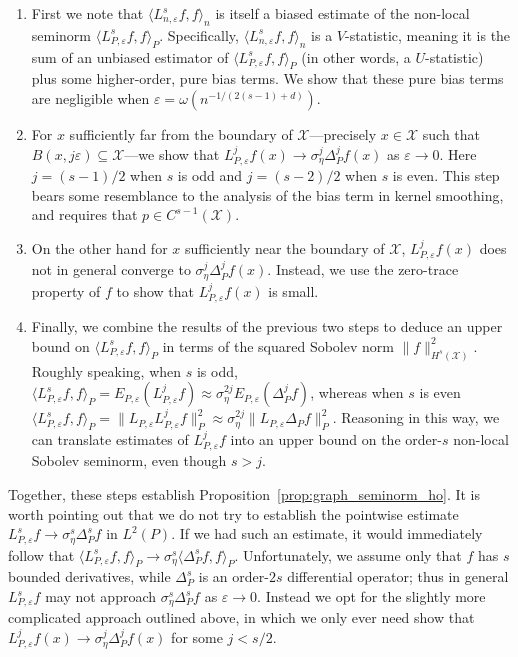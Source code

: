 \documentclass[aos]{imsart}
\theoremstyle{plain}
\theoremstyle{definition}
\theoremstyle{remark}
\newcommand{\dotp}[2]{\langle #1, #2 \rangle}
\newcommand{\mc}[1]{\mathcal{#1}}
\newcommand{\1}{\mathbf{1}}
\begin{document}
\begin{enumerate}
	\item First we note that $\dotp{L_{n,\varepsilon}^s f}{f}_n$ is itself a biased estimate of the non-local seminorm $\dotp{L_{P,\varepsilon}^sf}{f}_{P}$. Specifically, $\dotp{L_{n,\varepsilon}^s f}{f}_n$ is a $V$-statistic, meaning it is the sum of an unbiased estimator of $\dotp{L_{P,\varepsilon}^sf}{f}_{P}$ (in other words, a $U$-statistic) plus some higher-order, pure bias terms. We show that these pure bias terms are negligible when $\varepsilon = \omega(n^{-1/(2(s - 1) + d)})$. 
	\item For $x$ sufficiently far from the boundary of $\mc{X}$---precisely $x \in \mc{X}$ such that $B(x,j\varepsilon) \subseteq \mc{X}$---we show that $L_{P,\varepsilon}^jf(x) \to \sigma_{\eta}^j \Delta_P^jf(x)$ as $\varepsilon \to 0$. Here $j = (s - 1)/2$ when $s$ is odd and $j = (s - 2)/2$ when $s$ is even. This step bears some resemblance to the analysis of the bias term in kernel smoothing, and requires that $p \in C^{s-1}(\mc{X})$.
	\item On the other hand for $x$ sufficiently near the boundary of $\mc{X}$, $L_{P,\varepsilon}^jf(x)$ does not in general converge to $\sigma_{\eta}^j\Delta_P^jf(x)$. Instead, we use the zero-trace property of $f$ to show that $L_{P,\varepsilon}^jf(x)$ is small.
	\item Finally, we combine the results of the previous two steps to deduce an upper bound on $\dotp{L_{P,\varepsilon}^sf}{f}_{P}$ in terms of the squared Sobolev norm $\|f\|_{H^s(\mc{X})}^2$.  Roughly speaking, when $s$ is odd, $\dotp{L_{P,\varepsilon}^sf}{f}_P = E_{P,\varepsilon}(L_{P,\varepsilon}^jf) \approx \sigma_{\eta}^{2j}E_{P,\varepsilon}(\Delta_P^jf)$, whereas when $s$ is even $\dotp{L_{P,\varepsilon}^sf}{f}_P = \|L_{P,\varepsilon}L_{P,\varepsilon}^{j}f\|_{P}^2 \approx \sigma_{\eta}^{2j}\|L_{P,\varepsilon} \Delta_Pf\|_P^2$. Reasoning in this way, we can translate estimates of $L_{P,\varepsilon}^jf$ into an upper bound on the order-$s$ non-local Sobolev seminorm, even though $s > j$.
\end{enumerate}
Together, these steps establish Proposition~\ref{prop:graph_seminorm_ho}. It is worth pointing out that we do not try to establish the pointwise estimate $L_{P,\varepsilon}^sf \to \sigma_{\eta}^s\Delta_{P}^sf$ in $L^2(P)$. If we had such an estimate, it would immediately follow that $\dotp{L_{P,\varepsilon}^sf}{f}_{P} \to \sigma_{\eta}^s\dotp{\Delta_P^sf}{f}_{P}$. Unfortunately, we assume only that $f$ has $s$ bounded derivatives, while $\Delta_P^s$ is an order-$2s$ differential operator; thus in general $L_{P,\varepsilon}^sf$ may not approach $\sigma_{\eta}^s\Delta_{P}^sf$ as $\varepsilon \to 0$. Instead we opt for the slightly more complicated approach outlined above, in which we only ever need show that $L_{P,\varepsilon}^jf(x) \to \sigma_{\eta}^j \Delta_P^jf(x)$ for some $j < s/2$. 
\end{document}
